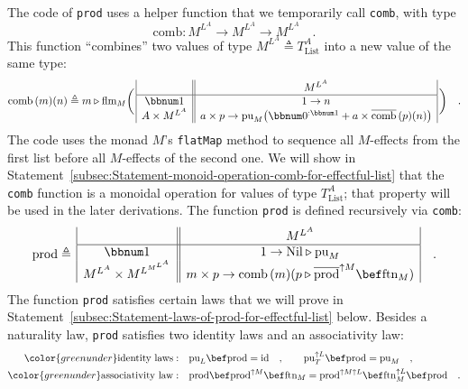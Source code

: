 The code of \lstinline!prod! uses a helper function that we temporarily
call \lstinline!comb!, with type
\[
\text{comb}:M^{L^{A}}\rightarrow M^{L^{A}}\rightarrow M^{L^{A}}\quad.
\]
This function \textsf{``}combines\textsf{''} two values of type $M^{L^{A}}\triangleq T_{\text{List}}^{A}$
into a new value of the same type:
\begin{equation}
\text{comb}\,(m)(n)\triangleq m\triangleright\text{flm}_{M}\bigg(\,\begin{array}{|c||c|}
 & M^{L^{A}}\\
\hline \bbnum 1 & 1\rightarrow n\\
A\times M^{L^{A}} & a\times p\rightarrow\text{pu}_{M}\big(\bbnum 0^{:\bbnum 1}+a\times\overline{\text{comb}}\,(p)(n)\big)
\end{array}\,\bigg)\quad.\label{eq:definition-of-comb-for-effectful-list}
\end{equation}
The code uses the monad $M$\textsf{'}s \lstinline!flatMap! method to sequence
all $M$-effects from the first list before all $M$-effects of the
second one. We will show in Statement~\ref{subsec:Statement-monoid-operation-comb-for-effectful-list}
that the \lstinline!comb! function is a monoidal operation for values
of type $T_{\text{List}}^{A}$; that property will be used in the
later derivations. The function \lstinline!prod! is defined recursively
via \lstinline!comb!:
\begin{equation}
\text{prod}\triangleq\,\begin{array}{|c||c|}
 & M^{L^{A}}\\
\hline \bbnum 1 & 1\rightarrow\text{Nil}\triangleright\text{pu}_{M}\\
M^{L^{A}}\times M^{L^{M^{L^{A}}}} & m\times p\rightarrow\text{comb}\,(m)(p\triangleright\overline{\text{prod}}^{\uparrow M}\bef\text{ftn}_{M})
\end{array}\quad.\label{eq:definition-of-prod-for-list-monad-transformer}
\end{equation}
The function \lstinline!prod! satisfies certain laws that we will
prove in Statement~\ref{subsec:Statement-laws-of-prod-for-effectful-list}
below. Besides a naturality law, \lstinline!prod! satisfies two identity
laws
and an associativity
law:
\begin{align}
{\color{greenunder}\text{identity laws}:}\quad & \text{pu}_{L}\bef\text{prod}=\text{id}\quad,\quad\quad\text{pu}_{T}^{\uparrow L}\bef\text{prod}=\text{pu}_{M}\quad,\label{eq:identity-laws-of-prod-for-effectful-list}\\
{\color{greenunder}\text{associativity law}:}\quad & \text{prod}\bef\text{prod}^{\uparrow M}\bef\text{ftn}_{M}=\text{prod}^{\uparrow M\uparrow L}\bef\text{ftn}_{M}^{\uparrow L}\bef\text{prod}\quad.\label{eq:associativity-law-of-prod-for-effectful-list}
\end{align}
